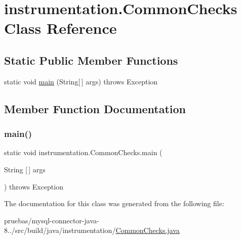 \hypertarget{classinstrumentation_1_1_common_checks}{}\section{instrumentation.\+Common\+Checks Class Reference}
\label{classinstrumentation_1_1_common_checks}
\subsection*{Static Public Member Functions}
\begin{DoxyCompactItemize}
\item 
static void \mbox{\hyperlink{classinstrumentation_1_1_common_checks_a704e077cb361588f58eb3e04ada7f77f}{main}} (String\mbox{[}$\,$\mbox{]} args)  throws Exception 
\end{DoxyCompactItemize}


\subsection{Member Function Documentation}
\mbox{\label{classinstrumentation_1_1_common_checks_a704e077cb361588f58eb3e04ada7f77f}} 
\subsubsection{\texorpdfstring{main()}{main()}}
{\footnotesize\ttfamily static void instrumentation.\+Common\+Checks.\+main (\begin{DoxyParamCaption}\item[{String \mbox{[}$\,$\mbox{]}}]{args }\end{DoxyParamCaption}) throws Exception\hspace{0.3cm}{\ttfamily [static]}}



The documentation for this class was generated from the following file\+:\begin{DoxyCompactItemize}
\item 
pruebas/mysql-\/connector-\/java-\/8../src/build/java/instrumentation/\mbox{\hyperlink{_common_checks_8java}{Common\+Checks.\+java}}\end{DoxyCompactItemize}
